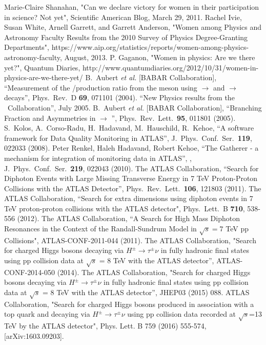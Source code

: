 \documentclass[11pt]{article}
\begin{document}
\begin{thebibliography}{99}
 Marie-Claire Shanahan, "Can we declare victory for women in their participation in science? Not yet", Scientific American Blog, March 29, 2011.
 Rachel Ivie, Susan White, Arnell Garrett, and Garrett Anderson, "Women among Physics and Astronomy Faculty Results from the 2010 Survey of Physics Degree-Granting Departments", 
https://www.aip.org/statistics/reports/women-among-physics-astronomy-faculty, August, 2013.
 P. Gaganon, "Women in physics: Are we there yet?", Quantum Diaries, http://www.quantumdiaries.org/2012/10/31/women-in-physics-are-we-there-yet/
 {}B.~Aubert {\it et al.}  [BABAR Collaboration], ``Measurement of the \Bu/\Bz production ratio from the \FourS meson using \Bp $\to$ \jpsi \Kp and \Bz $\to$ \jpsi \KS decays'', {}Phys.\ Rev.\ D {\bf 69}, 071101 (2004).
``New Physics results from the \babar\ Collaboration'', July 2005.
 {}B.~Aubert {\it et al.}  [BABAR Collaboration],
``Branching Fraction and \CP Asymmetries in \Bz $\to$ \KS \KS \KS'',
  Phys.\ Rev.\ Lett.\  {\bf 95}, 011801 (2005).
  S.~Kolos, A.~Corso-Radu, H.~Hadavand, M.~Hauschild, R.~Kehoe,
  ``A software framework for Data Quality Monitoring in ATLAS'',
  J.\ Phys.\ Conf.\ Ser.\  {\bf 119}, 022033 (2008).
  {}Peter Renkel, Haleh Hadavand, Robert Kehoe, ``The Gatherer - a mechanism for integration of monitoring data in ATLAS'', {}, J.\ Phys.\ Conf.\ Ser.\  {\bf 219}, 022043 (2010).
 {} The ATLAS Collaboration, ``Search for Diphoton Events with Large Missing Transverse Energy in 7 TeV Proton-Proton Collisions with the ATLAS Detector'', Phys.\ Rev.\ Lett.\  {\bf 106}, 121803 (2011).
 {} The ATLAS Collaboration, ``Search for extra dimensions using diphoton events in 7 TeV proton-proton collisions with the ATLAS detector", Phys.\ Lett.\ B {\bf 710}, 538-556 (2012).
 {} The ATLAS Collaboration, ``A Search for High Mass Diphoton Resonances in the Context of the Randall-Sundrum Model in $\sqrt s=7$ TeV pp Collisions", ATLAS-CONF-2011-044 (2011).
 {} The ATLAS Collaboration, "Search for charged Higgs bosons decaying via $H^{\pm} \rightarrow \tau^{\pm}\nu$ in fully hadronic final states using pp collision data at $\sqrt{s}$ = 8 TeV with the ATLAS detector'', ATLAS-CONF-2014-050 (2014).
 {} The ATLAS Collaboration, "Search for charged Higgs bosons decaying via $H^{\pm} \rightarrow \tau^{\pm}\nu$ in fully hadronic final states using pp collision data at $\sqrt{s}$ = 8 TeV with the ATLAS detector'', JHEP03 (2015) 088.
 {} ATLAS Collaboration, "Search for charged Higgs bosons produced in association with a top quark and decaying via $H^{\pm} \rightarrow \tau^{\pm}\nu$ 
using pp collision data recorded at $\sqrt s$=13 TeV by the ATLAS detector", Phys. Lett. B 759 (2016) 555-574,[arXiv:1603.09203].


\end{thebibliography}
\end{document}
